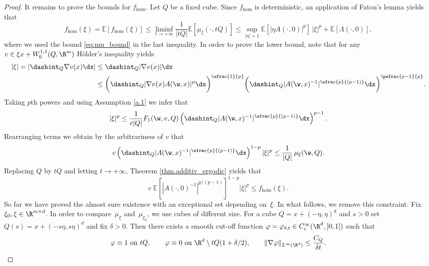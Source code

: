 \begin{proof}
It remains to prove the bounds for $f_{\hom}$. Let $Q$ be a fixed cube. Since $f_{\hom}$ is deterministic, an application of Fatou's lemma yields that
\begin{equation*}
f_{\hom}(\xi)=\mathbb{E}[f_{\hom}(\xi)]\leq \liminf_{t\to +\infty}\frac{1}{|tQ|}\mathbb{E}[\mu_{\xi}(\cdot,tQ)]\leq \sup_{|\eta|=1}\mathbb{E}[|\eta A(\cdot,0)|^p]\,|\xi|^p+\mathbb{E}[\Lambda(\cdot,0)],
\end{equation*}
where we used the bound \eqref{eq:mu_bound} in the last inequality. In order to prove the lower bound, note that for any $v\in \xi x+W_0^{1,1}(Q,\R^m)$ Hölder's inequality yields
\begin{align*}
|\xi|=\left|\dashint_Q \nabla v(x)\dx\right|&\leq \dashint_Q |\nabla v(x)|\dx
\\
&\leq \biggl(\dashint_Q |\nabla v(x)A(\w,x)|^p\dx\biggr)^{\sfrac{1}{p}}\biggl(\dashint_Q |A(\w,x)^{-1}|^{\sfrac{p}{(p-1)}}\dx\biggr)^{\psfrac{p-1}{p}}.
\end{align*}
Taking $p$th powers and using Assumption \ref{a.1} we infer that
\begin{equation*}
|\xi|^p\leq \frac{1}{c|Q|}F_1(\w,v,Q)\left(\dashint_Q |A(\w,x)^{-1}|^{\sfrac{p}{(p-1)}}\dx\right)^{p-1}.
\end{equation*}
Rearranging terms we obtain by the arbitrariness of $v$ that
\begin{equation}\label{eq:mu_superlinear}
c\left(\dashint_Q |A(\w,x)^{-1}|^{\sfrac{p}{(p-1)}}\dx\right)^{1-p}|\xi|^p\leq \frac{1}{|Q|}\,\mu_{\xi}(\w,Q).
\end{equation}
Replacing $Q$ by $tQ$ and letting $t\to +\infty$, Theorem \ref{thm.additiv_ergodic} yields that
\begin{equation*}
c\;\mathbb{E}\left[|A(\cdot,0)^{-1}|^{p/(p-1)}\right]^{1-p}|\xi|^p\leq f_{\hom}(\xi).
\end{equation*}
So far we have proved the almost sure existence with an exceptional set depending on~$\xi$. In what follows, we remove this constraint. Fix $\xi_0,\xi\in\R^{m\times d}$. In order to compare~$\mu_{\xi}$ and~$\mu_{\xi_0}$, we use cubes of different size. For a cube $Q=x+(-\eta,\eta)^d$ and $s>0$ set $Q(s)=x+(-s\eta,s\eta)^d$ and fix $\delta>0$. Then there exists a smooth cut-off function $\varphi=\varphi_{\delta,t}\in C_c^{\infty}(\R^d,[0,1])$ such that
\begin{equation*}
\varphi\equiv 1\text{ on }tQ,\quad\quad\varphi\equiv 0\text{ on }\R^d\setminus tQ(1+\delta/2),\quad\quad\|\nabla\varphi\|_{L^{\infty}(\R^d)}\leq \frac{C_Q}{\delta t}.
\end{equation*}

\end{proof}
